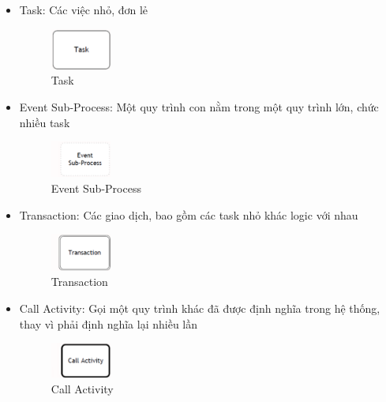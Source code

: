 \begin{itemize}
    \item Task: Các việc nhỏ, đơn lẻ
          \begin{figure}[!htp]
              \begin{center}
                  \includegraphics[width=2cm]{img/theory/BPMN/Task.png}
              \end{center}
              \caption{Task \cite{theoryBPMN0}}
          \end{figure}
    \item Event Sub-Process: Một quy trình con nằm trong một quy trình lớn, chức nhiều task
          \begin{figure}[!htp]
              \begin{center}
                  \includegraphics[width=2cm]{img/theory/BPMN/Event Sub-process.png}
              \end{center}
              \caption{Event Sub-Process \cite{theoryBPMN0}}
          \end{figure}
    \item Transaction: Các giao dịch, bao gồm các task nhỏ khác logic với nhau
          \begin{figure}[!htp]
              \begin{center}
                  \includegraphics[width=2cm]{img/theory/BPMN/Transaction.png}
              \end{center}
              \caption{Transaction \cite{theoryBPMN0}}
          \end{figure}
    \item Call Activity: Gọi một quy trình khác đã được định nghĩa trong hệ thống, thay vì phải định nghĩa lại nhiều lần
          \begin{figure}[!htp]
 
              \begin{center}
                  \includegraphics[width=2cm]{img/theory/BPMN/Call Activity.png}
              \end{center}
              \caption{Call Activity \cite{theoryBPMN0}}
          \end{figure}
\end{itemize}


